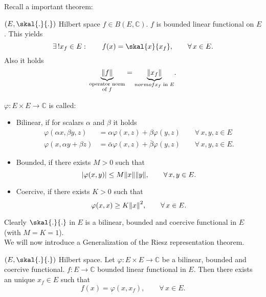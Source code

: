 Recall a important theorem:

\begin{theorem}
	$(E, \skal{.}{.})$ Hilbert space $f \in B(E,\mathbb{C})$. $f$ is bounded linear functional on $E$. This yields
	\[
		\exists\,! x_f \in E: \qquad f(x) = \skal{x}{x_f}, \qquad \forall\, x \in E.
	\]
	Also it holds
	\[
		\underset{\substack{\text{operator norm} \\ \text{of $f$}}}{\underbrace{\norm{f}}} = \underset{\substack{norm of} \\ \text{$x_f$ in $E$}}{\underbrace{\norm{x_f}}}.
	\]
\end{theorem}

\begin{definition}
	$\varphi: E \times E \to \mathbb{C}$ is called:
	\begin{itemize}
		\item Bilinear, if for scalars $\alpha$ and $\beta$ it holds
		\begin{align*}
			\varphi( \alpha x, \beta y,z) &= \alpha \varphi(x,z)+ \beta \varphi(y,z) \qquad \forall\, x,y,z \in E \\
			\varphi(x,\alpha y + \beta z) &= \bar{\alpha} \varphi(x,z) + \overline{\beta} \varphi(y,z) \qquad \forall\, x,y,z \in E.
		\end{align*}
		\item Bounded, if there exists $M>0$ such that
		\[
			\abs{\varphi(x,y)} \leq M \norm{x}\norm{y}, \qquad \forall\, x,y \in E.
		\]
		\item Coercive, if there exists $K>0$ such that
		\[
			\varphi(x,x) \geq K \norm{x}^2, \qquad \forall\, x \in E.
		\]
	\end{itemize}
\end{definition}
Clearly $\skal{.}{.}$ in $E$ is a bilinear, bounded and coercive functional in $E$ (with $M=K=1$). \\
We will now introduce a Generalization of the Riesz representation theorem.

\begin{theorem}
	$(E, \skal{.}{.})$ Hilbert space. Let $\varphi: E \times E \to \mathbb{C}$ be a bilinear, bounded and coercive functional. $f: E \to \mathbb{C}$ bounded linear functional in $E$. Then there exists an unique $x_f \in E$ such that
	\[
		f(x) = \varphi(x,x_f), \qquad  \forall\, x \in E.
	\]
\end{theorem}


